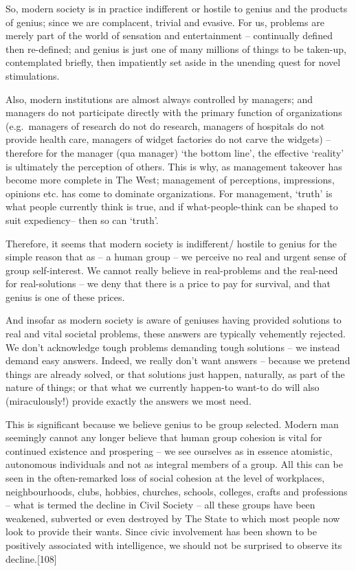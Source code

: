 \documentclass[
]{book}
\begin{document}
So, modern society is in practice indifferent or hostile to genius and the products of genius; since we are complacent, trivial and evasive. For us, problems are merely part of the world of sensation and entertainment -- continually defined then re-defined; and genius is just one of many millions of things to be taken-up, contemplated briefly, then impatiently set aside in the unending quest for novel stimulations.

Also, modern institutions are almost always controlled by managers; and managers do not participate directly with the primary function of organizations (e.g.~managers of research do not do research, managers of hospitals do not provide health care, managers of widget factories do not carve the widgets) -- therefore for the manager (qua manager) `the bottom line', the effective `reality' is ultimately the perception of others. This is why, as management takeover has become more complete in The West; management of perceptions, impressions, opinions etc. has come to dominate organizations. For management, `truth' is what people currently think is true, and if what-people-think can be shaped to suit expediency-- then so can `truth'.

Therefore, it seems that modern society is indifferent/ hostile to genius for the simple reason that as -- a human group -- we perceive no real and urgent sense of group self-interest. We cannot really believe in real-problems and the real-need for real-solutions -- we deny that there is a price to pay for survival, and that genius is one of these prices.

And insofar as modern society is aware of geniuses having provided solutions to real and vital societal problems, these answers are typically vehemently rejected. We don't acknowledge tough problems demanding tough solutions -- we instead demand easy answers. Indeed, we really don't want answers -- because we pretend things are already solved, or that solutions just happen, naturally, as part of the nature of things; or that what we currently happen-to want-to do will also (miraculously!) provide exactly the answers we most need.

This is significant because we believe genius to be group selected. Modern man seemingly cannot any longer believe that human group cohesion is vital for continued existence and prospering -- we see ourselves as in essence atomistic, autonomous individuals and not as integral members of a group. All this can be seen in the often-remarked loss of social cohesion at the level of workplaces, neighbourhoods, clubs, hobbies, churches, schools, colleges, crafts and professions -- what is termed the decline in Civil Society -- all these groups have been weakened, subverted or even destroyed by The State to which most people now look to provide their wants. Since civic involvement has been shown to be positively associated with intelligence, we should not be surprised to observe its decline.{[}108{]}
\end{document}
